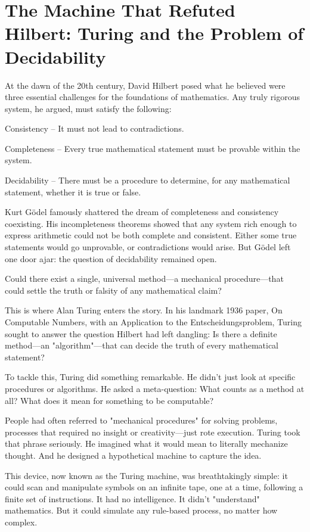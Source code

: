 \section{The Machine That Refuted Hilbert: Turing and the Problem of Decidability}

At the dawn of the 20th century, David Hilbert posed what he believed were three essential challenges for the foundations of mathematics. Any truly rigorous system, he argued, must satisfy the following:

Consistency – It must not lead to contradictions.

Completeness – Every true mathematical statement must be provable within the system.

Decidability – There must be a procedure to determine, for any mathematical statement, whether it is true or false.

Kurt Gödel famously shattered the dream of completeness and consistency coexisting. His incompleteness theorems showed that any system rich enough to express arithmetic could not be both complete and consistent. Either some true statements would go unprovable, or contradictions would arise. But Gödel left one door ajar: the question of decidability remained open.

Could there exist a single, universal method—a mechanical procedure—that could settle the truth or falsity of any mathematical claim?

This is where Alan Turing enters the story. In his landmark 1936 paper, On Computable Numbers, with an Application to the Entscheidungsproblem, Turing sought to answer the question Hilbert had left dangling: Is there a definite method—an "algorithm"—that can decide the truth of every mathematical statement?

To tackle this, Turing did something remarkable. He didn't just look at specific procedures or algorithms. He asked a meta-question: What counts as a method at all? What does it mean for something to be computable?

People had often referred to "mechanical procedures" for solving problems, processes that required no insight or creativity—just rote execution. Turing took that phrase seriously. He imagined what it would mean to literally mechanize thought. And he designed a hypothetical machine to capture the idea.

This device, now known as the Turing machine, was breathtakingly simple: it could scan and manipulate symbols on an infinite tape, one at a time, following a finite set of instructions. It had no intelligence. It didn’t "understand" mathematics. But it could simulate any rule-based process, no matter how complex.

